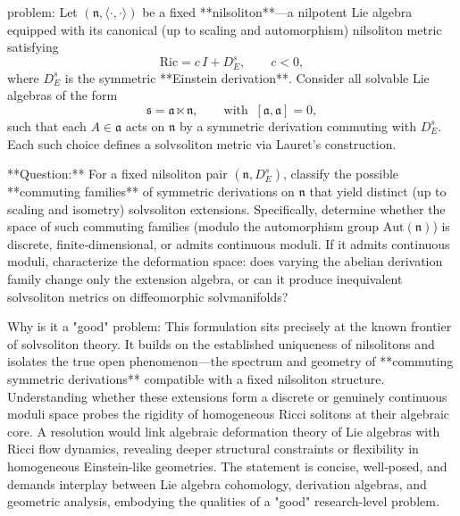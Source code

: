problem:  
Let \((\mathfrak n,\langle\cdot,\cdot\rangle)\) be a fixed **nilsoliton**—a nilpotent Lie algebra equipped with its canonical (up to scaling and automorphism) nilsoliton metric satisfying  
\[
\mathrm{Ric} = c\, I + D_E^s, \qquad c < 0,
\]
where \(D_E^s\) is the symmetric **Einstein derivation**.  
Consider all solvable Lie algebras of the form  
\[
\mathfrak s = \mathfrak a \ltimes \mathfrak n, \qquad \text{with }\ [\mathfrak a, \mathfrak a] = 0,
\]
such that each \(A \in \mathfrak a\) acts on \(\mathfrak n\) by a symmetric derivation commuting with \(D_E^s\). Each such choice defines a solvsoliton metric via Lauret’s construction.  

**Question:**  
For a fixed nilsoliton pair \((\mathfrak n, D_E^s)\), classify the possible **commuting families** of symmetric derivations on \(\mathfrak n\) that yield distinct (up to scaling and isometry) solvsoliton extensions.  
Specifically, determine whether the space of such commuting families (modulo the automorphism group \(\mathrm{Aut}(\mathfrak n)\)) is discrete, finite‑dimensional, or admits continuous moduli.  
If it admits continuous moduli, characterize the deformation space: does varying the abelian derivation family change only the extension algebra, or can it produce inequivalent solvsoliton metrics on diffeomorphic solvmanifolds?

Why is it a "good" problem:  
This formulation sits precisely at the known frontier of solvsoliton theory. It builds on the established uniqueness of nilsolitons and isolates the true open phenomenon—the spectrum and geometry of **commuting symmetric derivations** compatible with a fixed nilsoliton structure. Understanding whether these extensions form a discrete or genuinely continuous moduli space probes the rigidity of homogeneous Ricci solitons at their algebraic core. A resolution would link algebraic deformation theory of Lie algebras with Ricci flow dynamics, revealing deeper structural constraints or flexibility in homogeneous Einstein-like geometries. The statement is concise, well‑posed, and demands interplay between Lie algebra cohomology, derivation algebras, and geometric analysis, embodying the qualities of a "good" research-level problem.